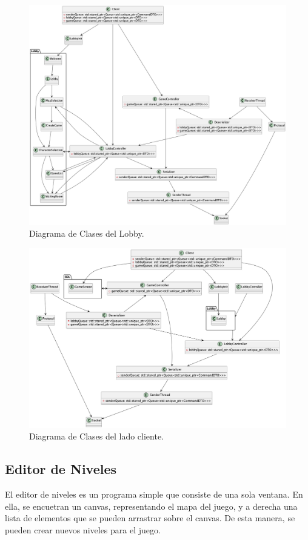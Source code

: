\documentclass[titlepage,a4paper]{article}
\begin{document}
\begin{figure}[H]
  \centering
  \includegraphics[width=\textwidth]{images/Diagrama de Clases Lobby.png}
  \caption{Diagrama de Clases del Lobby.}
  \label{fig:lobby}
\end{figure}

\begin{figure}[H]
  \centering
  \includegraphics[width=\textwidth]{images/Client.png}
  \caption{Diagrama de Clases del lado cliente.}
  \label{fig:client}
\end{figure}

\subsection{Editor de Niveles}
El editor de niveles es un programa simple que consiste de una sola ventana. En ella, se encuetran un canvas, representando el mapa del juego, y a derecha una lista de elementos que se pueden arrastrar sobre el canvas. De esta manera, se pueden crear nuevos niveles para el juego.
\end{document}
